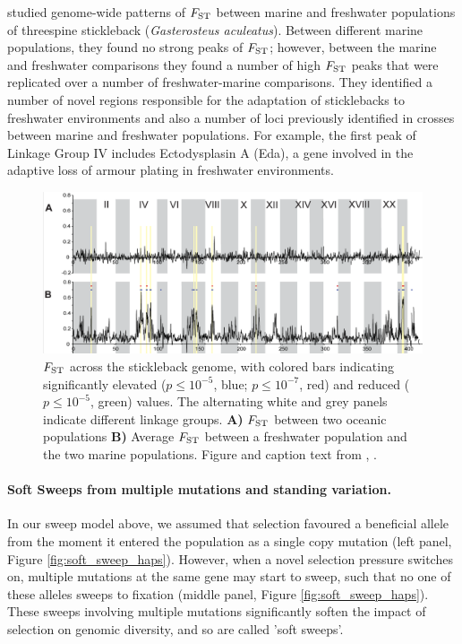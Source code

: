 \citet{hohenlohe2010population} studied genome-wide patterns of
$F_{\mathrm{ST}}$ between marine and freshwater populations of  threespine
stickleback ({\it Gasterosteus aculeatus}). 
Between different marine populations, they found no strong peaks of $F_{\mathrm{ST}}$;
however, between the marine and freshwater comparisons they found a
number of high $F_{\mathrm{ST}}$  peaks that were replicated over a number of
freshwater-marine comparisons. They identified a number of novel
regions responsible for the adaptation of sticklebacks to freshwater
environments and also a number of loci previously identified in crosses between marine and freshwater populations. For example, the first peak of Linkage
Group IV includes Ectodysplasin A (Eda), a gene involved in the adaptive loss of armour plating in freshwater environments.
\begin{figure}
\begin{center}
\includegraphics[width=0.9 \textwidth]{Journal_figs/recom_selection/Stickleback_FST/hohenlohe.png}
\end{center}
\caption{$F_{\mathrm{ST}}$ across the stickleback genome, with colored bars indicating
  significantly elevated ($p \leq 10^{−5}$, blue; $p \leq 10^{−7}$,
  red) and reduced ($p \leq 10^{−5}$, green) values. The alternating
  white and grey panels indicate different linkage groups. {\bf A)} $F_{\mathrm{ST}}$
  between two oceanic populations {\bf B)} Average $F_{\mathrm{ST}}$ between a
  freshwater population and the two marine populations. Figure and
  caption text from \citet{hohenlohe2010population}, \PLOSccBY.} \label{fig:local_sweep_haps}
\end{figure}


\paragraph{Soft Sweeps from multiple mutations and standing variation.}
In our sweep model above, we assumed that selection favoured a
beneficial allele from the moment it entered the population as a
single copy mutation  (left panel, Figure \ref{fig:soft_sweep_haps}). However, when a novel selection pressure
switches on, multiple mutations at the same gene
may start to sweep, such that no one of these alleles sweeps
to fixation (middle panel, Figure \ref{fig:soft_sweep_haps}). These sweeps involving multiple mutations significantly
soften the impact of selection on genomic diversity, and so are called 'soft sweeps'.

